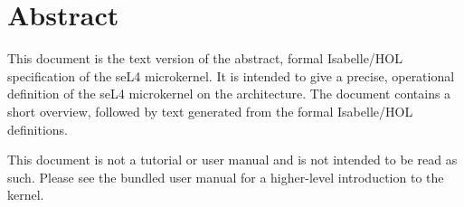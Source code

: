 \documentclass[10pt,a4paper]{scrbook}
\newcommand{\arch}{\xspace}
\begin{document}
\clearpage

\chapter*{Abstract}
This document is the text version of the abstract, formal
Isabelle/HOL specification of the seL4 microkernel. It is
intended to give a precise, operational definition of the
seL4 microkernel on the \arch architecture.
The document contains a short overview, followed by
text generated from the formal Isabelle/HOL definitions.

This document is not a tutorial or user manual and is not intended to be read
as such. Please see the bundled user manual for a higher-level introduction to
the kernel.

\cleardoublepage

\tableofcontents





\end{document}
